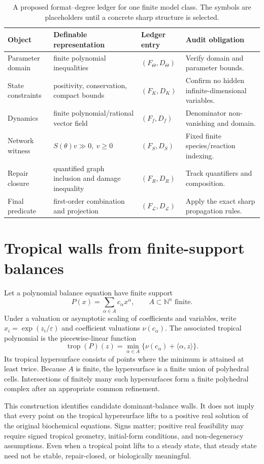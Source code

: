 \documentclass[11pt,a4paper]{article}
\theoremstyle{definition}
\theoremstyle{remark}
\newcommand{\N}{\mathbb{N}}
\newcommand{\Life}{\mathcal{L}}
\newcommand{\eps}{\varepsilon}
\begin{document}
\begin{table}[H]
\centering\small
\caption{A proposed format--degree ledger for one finite model class. The symbols are placeholders until a concrete sharp structure is selected.}
\begin{tabularx}{\textwidth}{@{}p{}p{}p{}X@{}}
\toprule
Object & Definable representation & Ledger entry & Audit obligation \\
\midrule
Parameter domain & finite polynomial inequalities & \((F_\Theta,D_\Theta)\) & Verify domain and parameter bounds.\\
State constraints & positivity, conservation, compact bounds & \((F_K,D_K)\) & Confirm no hidden infinite-dimensional variables.\\
Dynamics & finite polynomial/rational vector field & \((F_f,D_f)\) & Denominator non-vanishing and domain.\\
Network witness & \(S(\theta)v\gg0,\ v\geq0\) & \((F_S,D_S)\) & Fixed finite species/reaction indexing.\\
Repair closure & quantified graph inclusion and damage inequality & \((F_R,D_R)\) & Track quantifiers and composition.\\
Final predicate & first-order combination and projection & \((F_\Life,D_\Life)\) & Apply the exact sharp propagation rules.\\
\bottomrule
\end{tabularx}
\end{table}

\section{Tropical walls from finite-support balances}
Let a polynomial balance equation have finite support
\[
P(x)=\sum_{\alpha\in A} c_\alpha x^\alpha,
\qquad A\subset\N^n\text{ finite}.
\]
Under a valuation or asymptotic scaling of coefficients and variables, write \(x_i=\exp(z_i/\eps)\) and coefficient valuations \(\nu(c_\alpha)\). The associated tropical polynomial is the piecewise-linear function
\[
\operatorname{trop}(P)(z)=\min_{\alpha\in A}\{\nu(c_\alpha)+\langle\alpha,z\rangle\}.
\]
Its tropical hypersurface consists of points where the minimum is attained at least twice. Because \(A\) is finite, the hypersurface is a finite union of polyhedral cells. Intersections of finitely many such hypersurfaces form a finite polyhedral complex after an appropriate common refinement.

This construction identifies candidate dominant-balance walls. It does not imply that every point on the tropical hypersurface lifts to a positive real solution of the original biochemical equations. Signs matter; positive real feasibility may require signed tropical geometry, initial-form conditions, and non-degeneracy assumptions. Even when a tropical point lifts to a steady state, that steady state need not be stable, repair-closed, or biologically meaningful.
\end{document}
